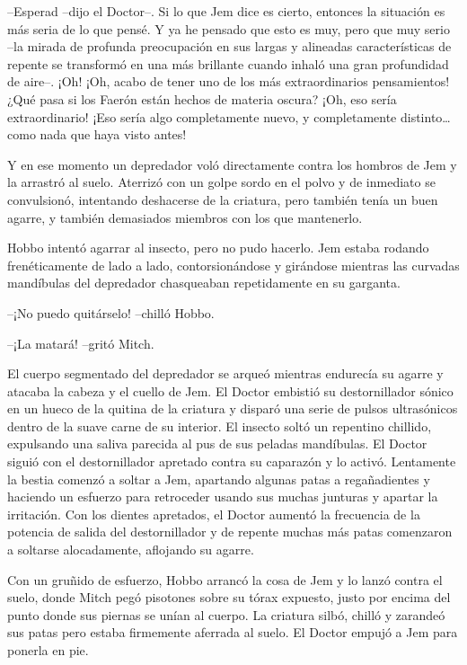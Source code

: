 {--Esperad --dijo el Doctor--. Si lo que Jem dice es cierto, entonces la
 situación es más seria de lo que pensé. Y ya he pensado que esto es muy,
 pero que muy serio --la mirada de profunda preocupación en sus largas y
 alineadas características de repente se transformó en una más brillante
 cuando inhaló una gran profundidad de aire--. ¡Oh! ¡Oh, acabo de tener
 uno de los más extraordinarios pensamientos! ¿Qué pasa si los Faerón
 están hechos de materia oscura? ¡Oh, eso sería extraordinario! ¡Eso
 sería algo completamente nuevo, y completamente distinto\ldots{} como
nada que haya visto antes!}

{Y en ese momento un depredador voló directamente contra los hombros de
 Jem y la arrastró al suelo. Aterrizó con un golpe sordo en el polvo y de
 inmediato se convulsionó, intentando deshacerse de la criatura, pero
 también tenía un buen agarre, y también demasiados miembros con los que
mantenerlo.}

{Hobbo intentó agarrar al insecto, pero no pudo hacerlo. Jem estaba
 rodando frenéticamente de lado a lado, contorsionándose y girándose
 mientras las curvadas mandíbulas del depredador chasqueaban
repetidamente en su garganta.}

{--¡No puedo quitárselo! --chilló Hobbo.}

{--¡La matará! --gritó Mitch.}

{El cuerpo segmentado del depredador se arqueó mientras endurecía su
 agarre y atacaba la cabeza y el cuello de Jem. El Doctor embistió su
 destornillador sónico en un hueco de la quitina de la criatura y disparó
 una serie de pulsos ultrasónicos dentro de la suave carne de su
 interior. El insecto soltó un repentino chillido, expulsando una saliva
 parecida al pus de sus peladas mandíbulas. El Doctor siguió con el
 destornillador apretado contra su caparazón y lo activó. Lentamente la
 bestia comenzó a soltar a Jem, apartando algunas patas a regañadientes y
 haciendo un esfuerzo para retroceder usando sus muchas junturas y
 apartar la irritación. Con los dientes apretados, el Doctor aumentó la
 frecuencia de la potencia de salida del destornillador y de repente
 muchas más patas comenzaron a soltarse alocadamente, aflojando su
agarre.}

{Con un gruñido de esfuerzo, Hobbo arrancó la cosa de Jem y lo lanzó
 contra el suelo, donde Mitch pegó pisotones sobre su tórax expuesto,
 justo por encima del punto donde sus piernas se unían al cuerpo. La
 criatura silbó, chilló y zarandeó sus patas pero estaba firmemente
aferrada al suelo. El Doctor empujó a Jem para ponerla en pie.}

